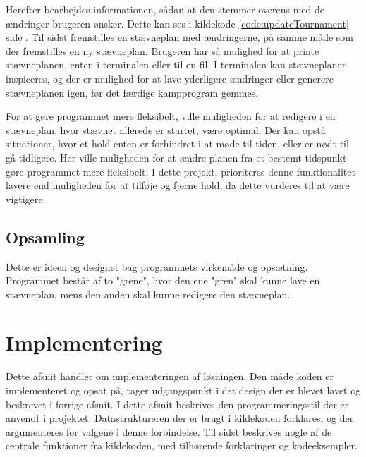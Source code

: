 \par
Herefter bearbejdes informationen, sådan at den stemmer overens med de ændringer brugeren ønsker. Dette kan ses i kildekode \ref{code:updateTournament} side \pageref{code:updateTournament}. Til sidst fremstilles en stævneplan med ændringerne, på samme måde som der fremstilles en ny stævneplan. Brugeren har så mulighed for at printe stævneplanen, enten i terminalen eller til en fil. I terminalen kan stævneplanen inspiceres, og der er mulighed for at lave yderligere ændringer eller generere stævneplanen igen, før det færdige kampprogram gemmes.
\par
For at gøre programmet mere fleksibelt, ville muligheden for at redigere i en stævneplan, hvor stævnet allerede er startet, være optimal. Der kan opstå situationer, hvor et hold enten er forhindret i at møde til tiden, eller er nødt til gå tidligere. Her ville muligheden for at ændre planen fra et bestemt tidspunkt gøre programmet mere fleksibelt. I dette projekt, prioriteres denne funktionalitet lavere end muligheden for at tilføje og fjerne hold, da dette vurderes til at være vigtigere.
\subsection*{Opsamling} 
Dette er ideen og designet bag programmets virkemåde og opsætning. Programmet består af to "grene", hvor den ene "gren" skal kunne lave en stævneplan, mens den anden skal kunne redigere den stævneplan.  


\section{Implementering}\label{implementering}
Dette afsnit handler om implementeringen af løsningen. Den måde koden er implementeret og opsat på, tager udgangspunkt i det design der er blevet lavet og beskrevet i forrige afsnit.
I dette afsnit beskrives den programmeringsstil der er anvendt i projektet. Datastruktureren der er brugt i kildekoden forklares, og der argumenteres for valgene i denne forbindelse. Til sidst beskrives nogle af de centrale funktioner fra kildekoden, med tilhørende forklaringer og kodeeksempler.


